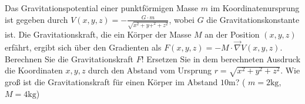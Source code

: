 \item Das Gravitationspotential einer punktförmigen Masse $m$ im Koordinatenursprung ist gegeben durch $V(x,y,z) = -\frac{G\cdot m}{\sqrt{x^2+y+^2+z^2}}$, wobei $G$ die Gravitationskonstante ist. Die Gravitationskraft, die ein Körper der Masse $M$ an der Position $(x,y,z)$ erfährt, ergibt sich über den Gradienten als $F(x,y,z) = -M \cdot \vec{\nabla} V(x,y,z)$. Berechnen Sie die Gravitationskraft $F$! Ersetzen Sie in dem berechneten Ausdruck die Koordinaten $x,y,z$ durch den Abstand vom Ursprung $r=\sqrt{x^2+y^2+z^2}$. Wie groß ist die Gravitationskraft für einen Körper im Abstand $10\text{m}$? ( $m=2\text{kg}$, $M=4\text{kg}$)